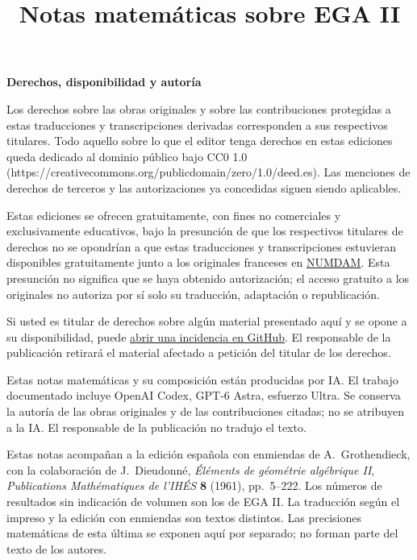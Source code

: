 \documentclass[11pt,a4paper]{article}
\title{Notas matemáticas sobre EGA II}
\author{}
\date{}
\begin{document}
\begingroup
\small
\noindent\textbf{Derechos, disponibilidad y autoría}

Los derechos sobre las obras originales y sobre las contribuciones protegidas a estas traducciones y transcripciones derivadas corresponden a sus respectivos titulares. Todo aquello sobre lo que el editor tenga derechos en estas ediciones queda dedicado al dominio público bajo CC0 1.0 (https://creativecommons.org/publicdomain/zero/1.0/deed.es). Las menciones de derechos de terceros y las autorizaciones ya concedidas siguen siendo aplicables.

Estas ediciones se ofrecen gratuitamente, con fines no comerciales y exclusivamente educativos, bajo la presunción de que los respectivos titulares de derechos no se opondrían a que estas traducciones y transcripciones estuvieran disponibles gratuitamente junto a los originales franceses en \href{https://www.numdam.org/}{NUMDAM}. Esta presunción no significa que se haya obtenido autorización; el acceso gratuito a los originales no autoriza por sí solo su traducción, adaptación o republicación.

Si usted es titular de derechos sobre algún material presentado aquí y se opone a su disponibilidad, puede \href{https://github.com/KokunoYumeto/ega-fga-es/issues}{abrir una incidencia en GitHub}. El responsable de la publicación retirará el material afectado a petición del titular de los derechos.

Estas notas matemáticas y su composición están producidas por IA. El trabajo documentado incluye OpenAI Codex, GPT-6 Astra, esfuerzo Ultra. Se conserva la autoría de las obras originales y de las contribuciones citadas; no se atribuyen a la IA. El responsable de la publicación no tradujo el texto.
\par
\endgroup
\clearpage

\maketitle
Estas notas acompañan a la edición española con enmiendas de
A.~Grothendieck, con la colaboración de J.~Dieudonné,
\emph{Éléments de géométrie algébrique II},
\emph{Publications Mathématiques de l'IHÉS} \textbf{8} (1961),
pp.~5--222. Los números de resultados sin indicación de volumen
son los de EGA II. La traducción según el impreso y la edición
con enmiendas son textos distintos. Las precisiones matemáticas
de esta última se exponen aquí por separado; no forman parte
del texto de los autores.
\end{document}
